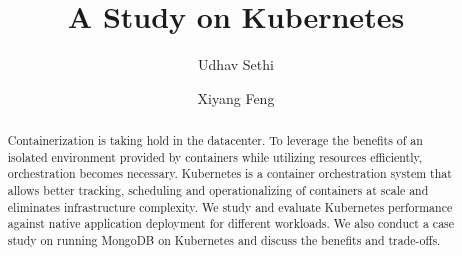 \documentclass[sigconf]{acmart}
\begin{document}
\title{A Study on Kubernetes}


\author{Udhav Sethi}

\author{Xiyang Feng}


\begin{abstract}
Containerization is taking hold in the datacenter. To leverage the benefits of an isolated environment provided by containers while utilizing resources efficiently, orchestration becomes necessary. Kubernetes is a container orchestration system that allows better tracking, scheduling and operationalizing of containers at scale and eliminates infrastructure complexity. We study and evaluate Kubernetes performance against native application deployment for different workloads. We also conduct a case study on running MongoDB on Kubernetes and discuss the benefits and trade-offs.
\end{abstract}

\end{document}
